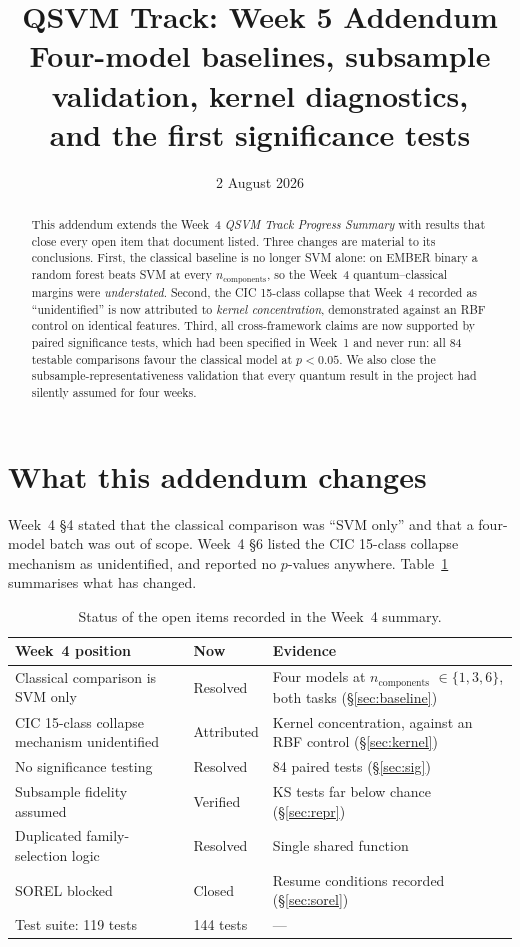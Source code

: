 \documentclass[11pt]{article}
\title{QSVM Track: Week 5 Addendum\\[0.3em]
\large Four-model baselines, subsample validation, kernel diagnostics,\\
and the first significance tests}
\date{2 August 2026}
\newcommand{\nc}{\ensuremath{n_{\mathrm{components}}}}
\begin{document}
\maketitle

\begin{abstract}
\noindent
This addendum extends the Week~4 \emph{QSVM Track Progress Summary} with results
that close every open item that document listed. Three changes are material to
its conclusions. First, the classical baseline is no longer SVM alone: on EMBER
binary a random forest beats SVM at every \nc{}, so the Week~4
quantum--classical margins were \emph{understated}. Second, the CIC 15-class
collapse that Week~4 recorded as ``unidentified'' is now attributed to
\emph{kernel concentration}, demonstrated against an RBF control on identical
features. Third, all cross-framework claims are now supported by paired
significance tests, which had been specified in Week~1 and never run: all 84
testable comparisons favour the classical model at $p < 0.05$. We also close the
subsample-representativeness validation that every quantum result in the project
had silently assumed for four weeks.
\end{abstract}

\section{What this addendum changes}

Week~4 \S4 stated that the classical comparison was ``SVM only'' and that a
four-model batch was out of scope. Week~4 \S6 listed the CIC 15-class collapse
mechanism as unidentified, and reported no $p$-values anywhere. Table~\ref{tab:delta}
summarises what has changed.

\begin{table}[htbp]
\centering
\small
\caption{Status of the open items recorded in the Week~4 summary.}
\label{tab:delta}
\begin{tabular}{@{}p{}p{}p{}@{}}
\toprule
\textbf{Week~4 position} & \textbf{Now} & \textbf{Evidence} \\
\midrule
Classical comparison is SVM only & Resolved & Four models at \nc{} $\in \{1,3,6\}$,
both tasks (\S\ref{sec:baseline}) \\
CIC 15-class collapse mechanism unidentified & Attributed & Kernel concentration,
against an RBF control (\S\ref{sec:kernel}) \\
No significance testing & Resolved & 84 paired tests (\S\ref{sec:sig}) \\
Subsample fidelity assumed & Verified & KS tests far below chance
(\S\ref{sec:repr}) \\
Duplicated family-selection logic & Resolved & Single shared function \\
SOREL blocked & Closed & Resume conditions recorded (\S\ref{sec:sorel}) \\
Test suite: 119 tests & 144 tests & --- \\
\bottomrule
\end{tabular}
\end{table}
\end{document}
